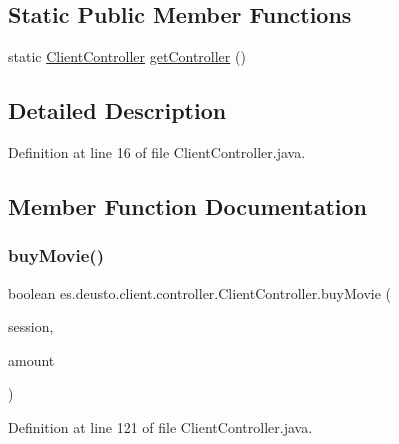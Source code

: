 \subsection*{Static Public Member Functions}
\begin{DoxyCompactItemize}
\item 
static \mbox{\hyperlink{classes_1_1deusto_1_1client_1_1controller_1_1_client_controller}{Client\+Controller}} \mbox{\hyperlink{classes_1_1deusto_1_1client_1_1controller_1_1_client_controller_aa76786bb097da98592adb6aeefa8d996}{get\+Controller}} ()
\end{DoxyCompactItemize}


\subsection{Detailed Description}


Definition at line 16 of file Client\+Controller.\+java.



\subsection{Member Function Documentation}
\mbox{\label{classes_1_1deusto_1_1client_1_1controller_1_1_client_controller_a92f0a66750a4f02c11de68814bc0d96f}} 
\subsubsection{\texorpdfstring{buyMovie()}{buyMovie()}}
{\footnotesize\ttfamily boolean es.\+deusto.\+client.\+controller.\+Client\+Controller.\+buy\+Movie (\begin{DoxyParamCaption}\item[{\mbox{\hyperlink{classes_1_1deusto_1_1server_1_1data_1_1_session_d_t_o}{Session\+D\+TO}}}]{session,  }\item[{int}]{amount }\end{DoxyParamCaption})}



Definition at line 121 of file Client\+Controller.\+java.

